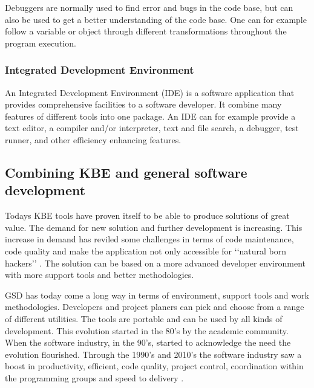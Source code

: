 Debuggers are normally used to find error and bugs in the code base, but can also be used to get a better understanding of the code base. One can for example follow a variable or object through different transformations throughout the program execution.

\subsubsection{Integrated Development Environment} %
\label{ssub:ide_support}
An Integrated Development Environment (IDE) is a software application that provides comprehensive facilities to a software developer. It combine many features of different tools into one package. An IDE can for example provide a text editor, a compiler and/or interpreter, text and file search, a debugger, test runner, and other efficiency enhancing features.


\subsection{Combining KBE and general software development} %
\label{sub:combinding_kbe_and_general_software_development}

Todays KBE tools have proven itself to be able to produce solutions of great value. The demand for new solution and further development is increasing. This increase in demand has reviled some challenges in terms of code maintenance, code quality and make the application not only accessible for ‘‘natural born hackers’’ \citep{rocca}. The solution can be based on a more advanced developer environment with more support tools and better methodologies.

GSD has today come a long way in terms of environment, support tools and work methodologies. Developers and project planers can pick and choose from a range of different utilities. The tools are portable and can be used by all kinds of development. This evolution started in the 80's by the academic community. When the software industry, in the 90's, started to acknowledge the need the evolution flourished. Through the 1990's and 2010's the software industry saw a boost in productivity, efficient, code quality, project control, coordination within the programming groups and speed to delivery \citep{case_tools}.


